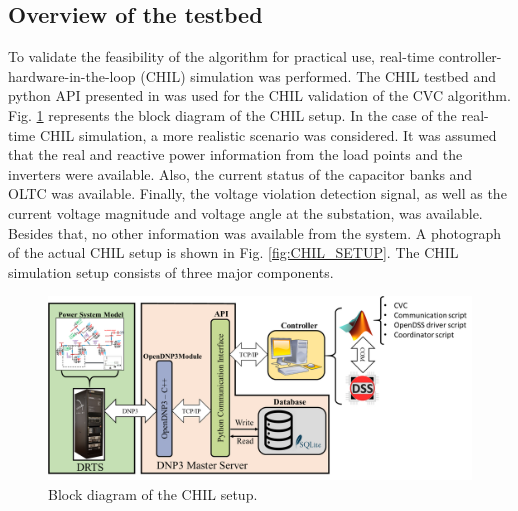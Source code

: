 \subsection{Overview of the testbed}
To validate the feasibility of the algorithm for practical use, real-time controller-hardware-in-the-loop (CHIL) simulation was performed. The CHIL testbed and python API presented in \cite{newaz2019controller} was used for the CHIL validation of the CVC algorithm. Fig. \ref{fig:CHIL_BLOCK} represents the block diagram of the CHIL setup. In the case of the real-time CHIL simulation, a more realistic scenario was considered. It was assumed that the real and reactive power information from the load points and the inverters were available. Also, the current status of the capacitor banks and OLTC was available. Finally, the voltage violation detection signal, as well as the current voltage magnitude and voltage angle at the substation, was available. Besides that, no other information was available from the system. A photograph of the actual CHIL setup is shown in Fig. \ref{fig:CHIL_SETUP}. The CHIL simulation setup consists of three major components.

\begin{figure}[!h]
\centering
\includegraphics[width=\linewidth]{figs/RT_BLOCK_2.png}
\caption{Block diagram of the CHIL setup.}
\label{fig:CHIL_BLOCK}
\end{figure}


